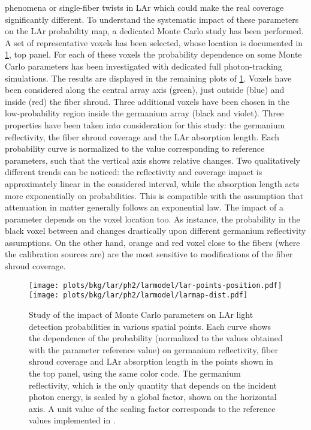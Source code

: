 phenomena or single-fiber twists in LAr which could make the real coverage significantly
different.
\newpar
To understand the systematic impact of these parameters on the LAr probability map, a
dedicated Monte Carlo study has been performed. A set of representative voxels has been
selected, whose location is documented in \cref{fig:bkg:lar:ph2:larmap:dist}, top panel.
For each of these voxels the probability dependence on some Monte Carlo parameters has
been investigated with dedicated full photon-tracking simulations. The results are
displayed in the remaining plots of \cref{fig:bkg:lar:ph2:larmap:dist}. Voxels have been
considered along the central array axis (green), just outside (blue) and inside (red) the
fiber shroud. Three additional voxels have been chosen in the low-probability region
inside the germanium array (black and violet). Three properties have been taken into
consideration for this study: the germanium reflectivity, the fiber shroud coverage and
the LAr absorption length. Each probability curve is normalized to the value corresponding
to reference parameters, such that the vertical axis shows relative changes. Two
qualitatively different trends can be noticed: the reflectivity and coverage impact is
approximately linear in the considered interval, while the absorption length acts more
exponentially on probabilities.  This is compatible with the assumption that attenuation
in matter generally follows an exponential law. The impact of a parameter depends on the
voxel location too. As instance, the probability in the black voxel between  and
 changes drastically upon different germanium reflectivity assumptions. On the
other hand, orange and red voxel close to the fibers (where the calibration sources are)
are the most sensitive to modifications of the fiber shroud coverage.

\begin{figure}
  \centering
  \texttt{[image: plots/bkg/lar/ph2/larmodel/lar-points-position.pdf]}
  \texttt{[image: plots/bkg/lar/ph2/larmodel/larmap-dist.pdf]}
  \caption{%
    Study of the impact of Monte Carlo parameters on LAr light detection probabilities in
    various spatial points. Each curve shows the dependence of the probability (normalized
    to the values obtained with the parameter reference value) on germanium reflectivity,
    fiber shroud coverage and LAr absorption length in the points shown in the top panel,
    using the same color code. The germanium reflectivity, which is the only quantity that
    depends on the incident photon energy, is scaled by a global factor, shown on the
    horizontal axis. A unit value of the scaling factor corresponds to the reference
    values implemented in \mage.
  }\label{fig:bkg:lar:ph2:larmap:dist}
\end{figure}


